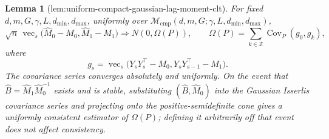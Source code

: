 \documentclass{article}
\newtheorem{lemma}{Lemma}
\begin{document}
\begin{lemma}[lem:uniform-compact-gaussian-lag-moment-clt]\label{lem:uniform-compact-gaussian-lag-moment-clt}
For fixed \(d,m,G,\gamma,L,d_{\min},d_{\max}\), uniformly over \(\mathcal M_{\mathrm{cmp}}(d,m,G;\gamma,L,d_{\min},d_{\max})\),
\[
 \sqrt n\,\operatorname{vec}_{s}
 \bigl(\widehat M_0-M_0,\widehat M_1-M_1\bigr)
 \Longrightarrow N(0,\Omega(P)),
 \qquad
 \Omega(P)=\sum_{k\in\mathbb Z}\operatorname{Cov}_P(g_0,g_k),
\]
where
\[
 g_s=\operatorname{vec}_{s}
 \bigl(Y_sY_s^\top-M_0,Y_sY_{s-1}^\top-M_1\bigr).
\]
The covariance series converges absolutely and uniformly.  On the event that \(\widehat B=\widehat M_1\widehat M_0^{-1}\) exists and is stable, substituting \((\widehat B,\widehat M_0)\) into the Gaussian Isserlis covariance series and projecting onto the positive-semidefinite cone gives a uniformly consistent estimator of \(\Omega(P)\); defining it arbitrarily off that event does not affect consistency.
\end{lemma}
\end{document}
